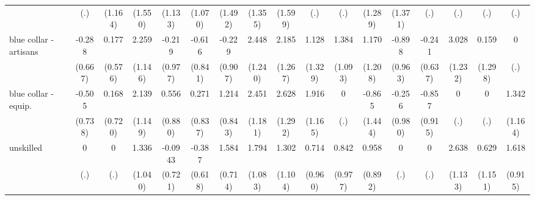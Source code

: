 {\begin{tabular}{l*{16}{c}}
                    &         (.)         &     (1.164)         &     (1.550)         &     (1.133)         &     (1.070)         &     (1.492)         &     (1.355)         &     (1.599)         &         (.)         &         (.)         &     (1.289)         &     (1.371)         &         (.)         &         (.)         &         (.)         &         (.)         \\
[1em]
blue collar - artisans&      -0.288         &       0.177         &       2.259\sym{*}  &      -0.219         &      -0.616         &      -0.229         &       2.448\sym{*}  &       2.185         &       1.128         &       1.384         &       1.170         &      -0.898         &      -0.241         &       3.028\sym{*}  &       0.159         &           0         \\
                    &     (0.667)         &     (0.576)         &     (1.146)         &     (0.977)         &     (0.841)         &     (0.907)         &     (1.240)         &     (1.267)         &     (1.329)         &     (1.093)         &     (1.208)         &     (0.963)         &     (0.637)         &     (1.232)         &     (1.298)         &         (.)         \\
[1em]
blue collar - equip.&      -0.505         &       0.168         &       2.139         &       0.556         &       0.271         &       1.214         &       2.451\sym{*}  &       2.628\sym{*}  &       1.916         &           0         &      -0.865         &      -0.256         &      -0.857         &           0         &           0         &       1.342         \\
                    &     (0.738)         &     (0.720)         &     (1.149)         &     (0.880)         &     (0.837)         &     (0.843)         &     (1.181)         &     (1.292)         &     (1.165)         &         (.)         &     (1.444)         &     (0.980)         &     (0.915)         &         (.)         &         (.)         &     (1.164)         \\
[1em]
unskilled           &           0         &           0         &       1.336         &     -0.0943         &      -0.387         &       1.584\sym{*}  &       1.794         &       1.302         &       0.714         &       0.842         &       0.958         &           0         &           0         &       2.638\sym{*}  &       0.629         &       1.618         \\
                    &         (.)         &         (.)         &     (1.040)         &     (0.721)         &     (0.618)         &     (0.714)         &     (1.083)         &     (1.104)         &     (0.960)         &     (0.977)         &     (0.892)         &         (.)         &         (.)         &     (1.133)         &     (1.151)         &     (0.915)         \\

\end{tabular}}
